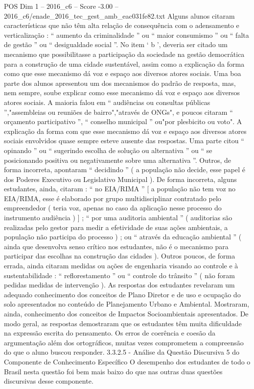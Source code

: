 \begin{textsample}{POS Dim 1 – 2016\_c6 – Score -3.00 – 2016\_c6/enade\_2016\_tec\_gest\_amb\_eac031fe82.txt}
Alguns alunos citaram características que não têm alta relação de consequência com o adensamento e verticalização : “ aumento da criminalidade ” ou “ maior consumismo ” ou “ falta de gestão ” ou “ desigualdade social ”.
No item ‘ b ’, deveria ser citado um mecanismo que possibilitasse a participação da sociedade na gestão democrática para a construção de uma cidade sustentável, assim como a explicação da forma como que esse mecanismo dá voz e espaço aos diversos atores sociais.
Uma boa parte dos alunos apresentou um dos mecanismos do padrão de resposta, mas, nem sempre, soube explicar como esse mecanismo dá voz e espaço aos diversos atores sociais.
A maioria falou em “ audiências ou consultas públicas ”,"assembleias ou reuniões de bairro","através de ONGs", e poucos citaram “ orçamento participativo ”, “ conselho municipal ” ou"por plesbicito ou voto".
A explicação da forma com que esse mecanismo dá voz e espaço aos diversos atores sociais envolvidos quase sempre esteve ausente das respostas.
Uma parte citou “ opinando ” ou “ sugerindo escolha de solução ou alternativa ” ou “ se posicionando positiva ou negativamente sobre uma alternativa ”.
Outros, de forma incorreta, apontaram “ decidindo ” ( a população não decide, esse papel é dos Poderes Executivo ou Legislativo Municipal ).
De forma incorreta, alguns estudantes, ainda, citaram : “ no EIA/RIMA ” [ a população não tem voz no EIA/RIMA, esse é elaborado por grupo multidisciplinar contratado pelo empreendedor ( teria voz, apenas no caso da aplicação nesse processo do instrumento audiência ) ] ; “ por uma auditoria ambiental ” ( auditorias são realizadas pelo gestor para medir a efetividade de suas ações ambientais, a população não participa do processo ) ; ou “ através da educação ambiental ” ( ainda que desenvolva senso crítico nos estudantes, não é o mecanismo para participar das escolhas na construção das cidades ).
Outros poucos, de forma errada, ainda citaram medidas ou ações de engenharia visando ao controle e à sustentabilidade : “ reflorestamento ” ou “ controle do trânsito ” ( não foram pedidas medidas de intervenção ).
As respostas dos estudantes revelaram um adequado conhecimento dos conceitos de Plano Diretor e de uso e ocupação do solo apresentados no conteúdo de Planejamento Urbano e Ambiental.
Mostraram, ainda, conhecimento dos conceitos de Impactos Socioambientais apresentados.
De modo geral, as respostas demostraram que os estudantes têm muita dificuldade na expressão escrita do pensamento.
Os erros de coerência e coesão da argumentação além dos ortográficos, muitas vezes comprometem a compreensão do que o aluno buscou responder. 3.3.2.5 - Análise da Questão Discursiva 5 do Componente de Conhecimento Específico O desempenho dos estudantes de todo o Brasil nesta questão foi bem mais baixo do que nas outras duas questões discursivas desse componente.

\end{textsample}

